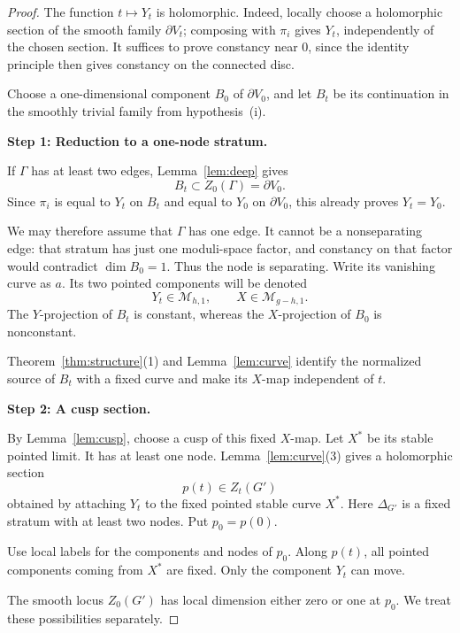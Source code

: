 \documentclass[11pt]{article}
\newcommand{\M}{\mathcal M}
\theoremstyle{remark}
\begin{document}
\begin{proof}
The function \(t\mapsto Y_t\) is holomorphic. Indeed, locally
choose a holomorphic section of the smooth family
\(\partial V_t\); composing with \(\pi_i\) gives \(Y_t\),
independently of the chosen section. It suffices to prove
constancy near \(0\), since the identity principle then gives
constancy on the connected disc.

Choose a one-dimensional component \(B_0\) of
\(\partial V_0\), and let \(B_t\) be its continuation in the
smoothly trivial family from hypothesis~(i).

\medskip
\noindent\textbf{Step 1: Reduction to a one-node stratum.}

If \(\Gamma\) has at least two edges,
Lemma~\ref{lem:deep} gives
\[
B_t\subset Z_0(\Gamma)=\partial V_0.
\]
Since \(\pi_i\) is equal to \(Y_t\) on \(B_t\) and equal to
\(Y_0\) on \(\partial V_0\), this already proves \(Y_t=Y_0\).

We may therefore assume that \(\Gamma\) has one edge.
It cannot be a nonseparating edge: that stratum has just one
moduli-space factor, and constancy on that factor would
contradict \(\dim B_0=1\). Thus the node is separating.
Write its vanishing curve as \(a\). Its two pointed components
will be denoted
\[
Y_t\in\M_{h,1},
\qquad
X\in\M_{g-h,1}.
\]
The \(Y\)-projection of \(B_t\) is constant, whereas the
\(X\)-projection of \(B_0\) is nonconstant.

Theorem~\ref{thm:structure}(1) and
Lemma~\ref{lem:curve} identify the normalized source of \(B_t\)
with a fixed curve and make its \(X\)-map independent of \(t\).


\medskip
\noindent\textbf{Step 2: A cusp section.}

By Lemma~\ref{lem:cusp}, choose a cusp of this fixed
\(X\)-map. Let \(X^\ast\) be its stable pointed limit.
It has at least one node. Lemma~\ref{lem:curve}(3) gives a
holomorphic section
\[
p(t)\in Z_t(G')
\]
obtained by attaching \(Y_t\) to the fixed pointed stable curve
\(X^\ast\). Here \(\Delta_{G'}\) is a fixed stratum with at least
two nodes. Put \(p_0=p(0)\).

Use local labels for the components and nodes of \(p_0\).
Along \(p(t)\), all pointed components coming from \(X^\ast\)
are fixed. Only the component \(Y_t\) can move.

The smooth locus \(Z_0(G')\) has local dimension either zero
or one at \(p_0\). We treat these possibilities separately.


\end{proof}
\end{document}
